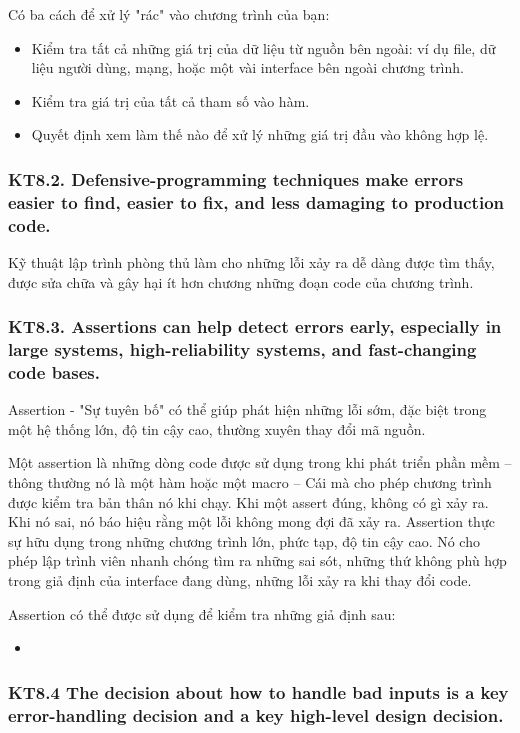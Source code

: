 \documentclass[12pt]{report}
\begin{document}
Có ba cách để xử lý "rác" vào chương trình của bạn:
\begin{itemize}
	\item Kiểm tra tất cả những giá trị của dữ liệu từ nguồn bên ngoài: ví dụ file, dữ liệu người dùng, mạng, hoặc một vài interface bên ngoài chương trình. 
	\item Kiểm tra giá trị của tất cả tham số vào hàm. 
	\item Quyết định xem làm thế nào để xử lý những giá trị đầu vào không hợp lệ.  
\end{itemize}


\subsubsection{KT8.2. Defensive-programming techniques make errors easier to find, easier to fix, and less damaging to production code.}
Kỹ thuật lập trình phòng thủ làm cho những lỗi xảy ra dễ dàng được tìm thấy, được sửa chữa và gây hại ít hơn chương những đoạn code của chương trình. 

\subsubsection{KT8.3. Assertions can help detect errors early, especially in large systems, high-reliability systems, and fast-changing code bases.}
Assertion - "Sự tuyên bố" có thể giúp phát hiện những lỗi sớm, đặc biệt trong một hệ thống lớn, độ tin cậy cao, thường xuyên thay đổi mã nguồn. 
\vspace*{3mm}

Một assertion là những dòng code được sử dụng trong khi phát triển phần mềm -- 	thông thường nó là một hàm hoặc một macro -- Cái mà cho phép chương trình được kiểm tra bản thân nó khi chạy. Khi một assert đúng, không có gì xảy ra. Khi nó sai, nó báo hiệu rằng một lỗi không mong đợi đã xảy ra. Assertion thực sự hữu dụng trong những chương trình lớn, phức tạp, độ tin cậy cao. Nó cho phép lập trình viên nhanh chóng tìm ra những sai sót, những thứ không phù hợp trong giả định của interface đang dùng, những lỗi xảy ra khi thay đổi code. 

Assertion có thể được sử dụng để kiểm tra những giả định sau: 
\begin{itemize}
	\item 
\end{itemize}

\subsubsection{KT8.4 The decision about how to handle bad inputs is a key error-handling decision and a key high-level design decision.}
\end{document}
